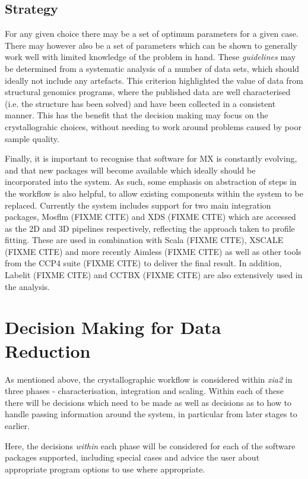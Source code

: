 \documentclass[a4paper,11pt]{article}
\begin{document}
\subsection{Strategy}

For any given choice there may be a set of optimum parameters for a
given case. There may however also be a set of parameters which can be
shown to generally work well with limited knowledge of the problem in
hand. These \emph{guidelines} may be determined from a systematic
analysis of a number of data sets, which should ideally not include
any artefacts. This criterion highlighted the value of data from
structural genomics programs, where the published data are well
characterised (i.e. the structure has been solved) and have been
collected in a consistent manner. This has the benefit that the
decision making may focus on the crystallograhic choices, without
needing to work around problems caused by poor sample quality. 

Finally, it is important to recognise that software for MX is
constantly evolving, and that new packages will become available which
ideally should be incorporated into the system. As such, some emphasis
on abstraction of steps in the workflow is also helpful, to allow
existing components within the system to be replaced. Currently the
system includes support for two main integration packages, Mosflm
(FIXME CITE) and XDS (FIXME CITE) which are accessed as the 2D and 3D
pipelines respectively, reflecting the approach taken to profile
fitting. These are used in combination with Scala (FIXME CITE), XSCALE
(FIXME CITE) and more recently Aimless (FIXME CITE) as well as other
tools from the CCP4 suite (FIXME CITE) to deliver the final result. In
addition, Labelit (FIXME CITE) and CCTBX (FIXME CITE) are also
extensively used in the analysis.

\section{Decision Making for Data Reduction}

As mentioned above, the crystallographic workflow is considered within
\emph{xia2} in three phases - characterisation, integration and
scaling. Within each of these there will be decisions which need to be
made as well as decisions as to how to handle passing information
around the system, in particular from later stages to earlier. 

Here, the decisions \emph{within} each phase will be considered for
each of the software packages supported, including special cases and
advice the user about appropriate program options to use where
appropriate.
\end{document}
